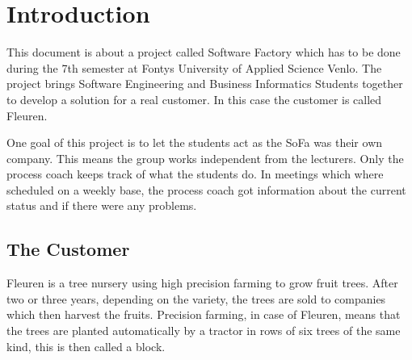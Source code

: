 \section{Introduction}
This document is about a project called Software Factory which has to be done during the 7th semester at Fontys University of Applied Science Venlo. The project brings Software Engineering and Business Informatics Students together to develop a solution for a real customer. In this case the customer is called Fleuren. 

One goal of this project is to let the students act as the SoFa was their own company. This means the group works independent from the lecturers. Only the process coach keeps track of what the students do. In meetings which where scheduled on a weekly base, the process coach got information about the current status and if there were any problems. 

\subsection{The Customer}
Fleuren is a tree nursery using high precision farming to grow fruit trees. After two or three years, depending on the variety, the trees are sold to companies which then harvest the fruits. Precision farming, in case of Fleuren, means that the trees are planted automatically by a tractor in rows of six trees of the same kind, this is then called a block.

